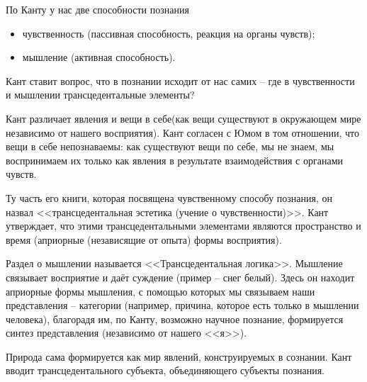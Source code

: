 \documentclass[a4paper, 12pt]{book} %
\begin{document}
По Канту у нас две способности познания
\begin{itemize}
\item чувственность (пассивная способность, реакция на органы чувств);
\item мышление (активная способность).
\end{itemize}
Кант ставит вопрос, что в познании исходит от нас самих -- где в чувственности и мышлении трансцедентальные элементы?

Кант различает явления и вещи в себе(как вещи существуют в окружающем мире независимо от нашего восприятия). Кант согласен с Юмом в том отношении, что вещи в себе непознаваемы: как существуют вещи по себе, мы не знаем, мы воспринимаем их только как явления в результате взаимодействия с органами чувств.

Ту часть его книги, которая посвящена чувственному способу познания, он назвал <<трансцедентальная эстетика (учение о чувственности)>>. Кант утверждает, что этими трансцедентальными элементами являются пространство и время (априорные (независящие от опыта) формы восприятия).

Раздел о мышлении называется <<Трансцедентальная логика>>. Мышление связывает восприятие и даёт суждение (пример -- снег белый). Здесь он находит априорные формы мышления, с помощью которых мы связываем наши представления -- категории (например, причина, которое есть только в мышлении человека), благорадя им, по Канту, возможно научное познание, формируется синтез представления (независимо от нашего <<я>>). 

Природа сама формируется как мир явлений, конструируемых в сознании. Кант вводит трансцедентального субъекта, объединяющего субъекты познания.
\end{document}
